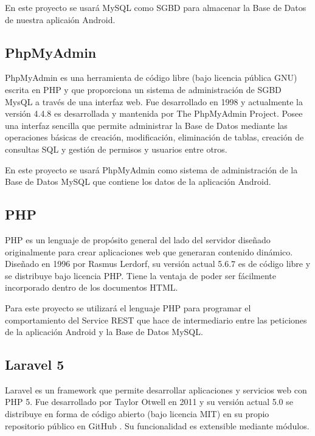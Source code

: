 	En este proyecto se usará MySQL como SGBD para almacenar la Base de Datos de nuestra aplicaión Android.
    
    \subsection{PhpMyAdmin}\label{ssec:phpmyadmin}
    
	PhpMyAdmin \cite{ref:phpMyAdmin} es una herramienta de código libre (bajo licencia pública GNU) escrita en PHP y que proporciona un sistema de administración de SGBD MysQL a través de una interfaz web. Fue desarrollado en 1998 y actualmente la versión 4.4.8 es desarrollada y mantenida por The PhpMyAdmin Project. Posee una interfaz sencilla que permite administrar la Base de Datos mediante las operaciones básicas de creación, modificación, eliminación de tablas,  creación de consultas SQL y gestión de permisos y usuarios entre otros.
	
	En este proyecto se usará PhpMyAdmin como sistema de administración de la Base de Datos MySQL que contiene los datos de la aplicación Android.
    
    \subsection{PHP}\label{ssec:php}
    
	PHP \cite{ref:php} es un lenguaje de propósito general del lado del servidor diseñado originalmente para crear aplicaciones web que generaran contenido dinámico. Diseñado en 1996 por Rasmus Lerdorf, su versión actual 5.6.7 es de código libre y se distribuye bajo licencia PHP. Tiene la ventaja de poder ser fácilmente incorporado dentro de los documentos HTML.
	
	Para este proyecto se utilizará el lenguaje PHP para programar el comportamiento del Service REST que hace de intermediario entre las peticiones de la aplicación Android y la Base de Datos MySQL.
    
    \subsection{Laravel 5}\label{ssec:laravel}
    
	Laravel \cite{ref:laravel} es un framework que permite desarrollar aplicaciones y servicios web con PHP 5. Fue desarrollado por Taylor Otwell en 2011 y su versión actual 5.0 se distribuye en forma de código abierto (bajo licencia MIT) en su propio repositorio público en GitHub \cite{ref:laravel_github}. Su funcionalidad es extensible mediante módulos.
	
